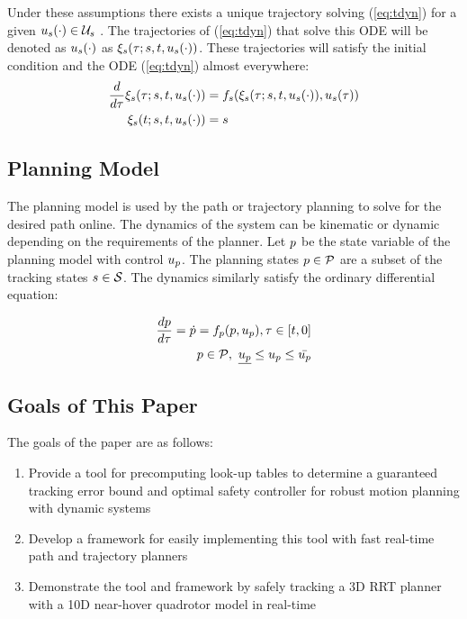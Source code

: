 Under these assumptions there exists a unique trajectory solving (\ref{eq:tdyn}) for a given $u_s(\cdot) \in \mathcal{U}_s$ \cite{Coddington84}. The trajectories of (\ref{eq:tdyn}) that solve this ODE will be denoted as $u_s(\cdot)$ as $\xi_{s}(\tau; s, t, u_s(\cdot))$. These trajectories will satisfy the initial condition and the ODE (\ref{eq:tdyn}) almost everywhere:
\begin{equation}
\label{eq:fdyn_traj}
\begin{aligned}
\frac{d}{d\tau}\xi_{s}(\tau; s, t, u_s(\cdot)) &= f_s(\xi_{s}(\tau; s, t, u_s(\cdot)), u_s(\tau)) \\
\xi_{s}(t; s, t, u_s(\cdot)) &= s
\end{aligned}
\end{equation}

\subsection{Planning Model}
The planning model is used by the path or trajectory planning to solve for the desired path online.  The dynamics of the system can be kinematic or dynamic depending on the requirements of the planner. Let $p$ be the state variable of the planning model with control $u_p$. The planning states $p \in \mathcal{P}$ are a subset of the tracking states $s \in \mathcal{S}$. The dynamics similarly satisfy the ordinary differential equation:

\begin{equation}
\begin{aligned}
\label{eq:pdyn}
\frac{dp}{d\tau} = \dot{p} = f_p(p, u_p), \tau \in [t, 0] \\
p \in \mathcal{P}, \ \underline{u_p} \leq u_p \leq \bar{u_p}
\end{aligned}
\end{equation}

\subsection{Goals of This Paper}
The goals of the paper are as follows:
\begin{enumerate}
	\item Provide a tool for precomputing look-up tables to determine a guaranteed tracking error bound and optimal safety controller for robust motion planning with dynamic systems
	\item Develop a framework for easily implementing this tool with fast real-time path and trajectory planners
	\item Demonstrate the tool and framework by safely tracking a 3D RRT planner with a 10D near-hover quadrotor model in real-time
\end{enumerate}
